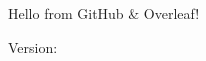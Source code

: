 \documentclass{article}
\begin{document}
Hello from GitHub \& Overleaf!  

Version: \buildversion
\end{document}
